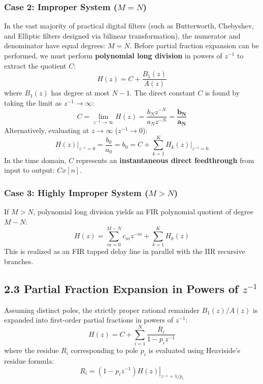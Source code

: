 \documentclass[11pt,a4paper]{article}
\begin{document}
\subsubsection{\texorpdfstring{Case 2: Improper System ($M = N$)}{Case 2: Improper System (M = N)}}
In the vast majority of practical digital filters (such as Butterworth, Chebyshev, and Elliptic filters designed via bilinear transformation), the numerator and denominator have equal degrees: $M = N$. 
Before partial fraction expansion can be performed, we must perform \textbf{polynomial long division} in powers of $z^{-1}$ to extract the quotient $C$:
\begin{equation}
H(z) = C + \frac{B_1(z)}{A(z)}
\end{equation}
where $B_1(z)$ has degree at most $N - 1$.
The direct constant $C$ is found by taking the limit as $z^{-1} \to \infty$:
\begin{equation}
C = \lim_{z^{-1} \to \infty} H(z) = \frac{b_N z^{-N}}{a_N z^{-N}} = \mathbf{\frac{b_N}{a_N}}
\label{eq:direct_term_C}
\end{equation}
Alternatively, evaluating at $z \to \infty$ ($z^{-1} \to 0$):
\begin{equation}
H(z)\Big|_{z^{-1}=0} = \frac{b_0}{a_0} = b_0 = C + \sum_{k=1}^K H_k(z)\Big|_{z^{-1}=0}
\end{equation}
In the time domain, $C$ represents an \textbf{instantaneous direct feedthrough} from input to output: $C x[n]$.

\subsubsection{\texorpdfstring{Case 3: Highly Improper System ($M > N$)}{Case 3: Highly Improper System (M > N)}}
If $M > N$, polynomial long division yields an FIR polynomial quotient of degree $M - N$:
\begin{equation}
H(z) = \sum_{m=0}^{M-N} c_m z^{-m} + \sum_{k=1}^K H_k(z)
\end{equation}
This is realized as an FIR tapped delay line in parallel with the IIR recursive branches.

\subsection{\texorpdfstring{2.3 Partial Fraction Expansion in Powers of $z^{-1}$}{2.3 Partial Fraction Expansion in Powers of z-inverse}}
Assuming distinct poles, the strictly proper rational remainder $B_1(z)/A(z)$ is expanded into first-order partial fractions in powers of $z^{-1}$:
\begin{equation}
H(z) = C + \sum_{i=1}^N \frac{R_i}{1 - p_i z^{-1}}
\end{equation}
where the residue $R_i$ corresponding to pole $p_i$ is evaluated using Heaviside's residue formula:
\begin{equation}
R_i = \left. (1 - p_i z^{-1}) H(z) \right|_{z^{-1} = 1/p_i}
\label{eq:heaviside_residue}
\end{equation}
\end{document}
